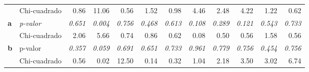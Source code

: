 \documentclass[mathematics,article,submit,moreauthors,pdftex]{mdpi}
\begin{document}
\begin{table}[H]
\begin{tabular}{llrrrrrrrrrr}
                                           & Chi-cuadrado                               & 0.86                                  & 11.06                                 & 0.56                                  & 1.52                                  & 0.98                                  & 4.46                                  & 2.48                                  & 4.22                                  & 1.22                                  & 0.62                                  \\ \cline{2-12} 
\multirow{-2}{*}{\textbf{a}}               & \textit{p-valor}                           & \textit{0.651}                        & {\color[HTML]{C00000} \textit{0.004}} & \textit{0.756}                        & \textit{0.468}                        & \textit{0.613}                        & \textit{0.108}                        & \textit{0.289}                        & \textit{0.121}                        & \textit{0.543}                        & \textit{0.733}                        \\ \hline
                                           & Chi-cuadrado                               & 2.06                                  & 5.66                                  & 0.74                                  & 0.86                                  & 0.62                                  & 0.08                                  & 0.50                                  & 0.56                                  & 1.58                                  & 0.56                                  \\ \cline{2-12} 
\multirow{-2}{*}{\textbf{b}}               & p-valor                                    & \textit{0.357}                        & \textit{0.059}                        & \textit{0.691}                        & \textit{0.651}                        & \textit{0.733}                        & \textit{0.961}                        & \textit{0.779}                        & \textit{0.756}                        & \textit{0.454}                        & \textit{0.756}                        \\ \hline
                                           & Chi-cuadrado                               & 0.56                                  & 0.02                                  & 12.50                                 & 0.14                                  & 0.32                                  & 1.04                                  & 2.18                                  & 3.50                                  & 3.02                                  & 6.74                                  \\ \cline{2-12} 

\end{tabular}
\end{table}
\end{document}
